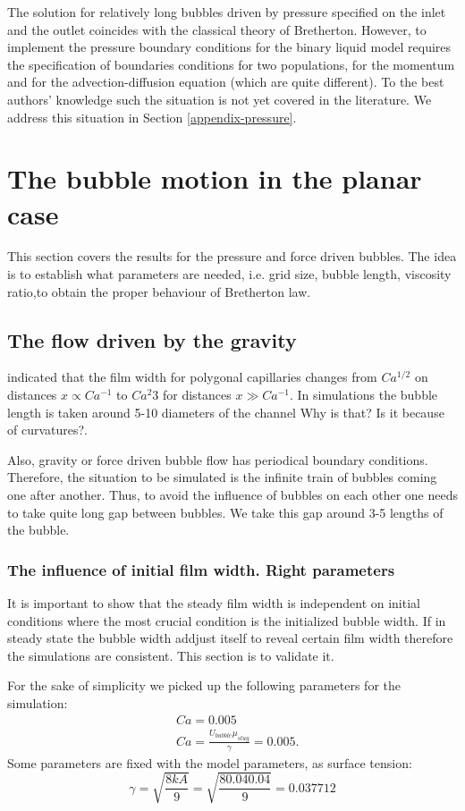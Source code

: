\documentclass{article}
\begin{document}
The solution
for relatively long bubbles driven by pressure specified on the inlet and the
outlet coincides with the classical theory of Bretherton. However, to implement
the pressure boundary conditions for the binary liquid model requires the
specification of boundaries conditions for two populations, for the momentum and
for the advection-diffusion equation (which are quite different). To the best
authors' knowledge such the situation is not yet covered in the literature. We
address this situation in Section \ref{appendix-pressure}. 

\section{The bubble motion in the planar case}
This section covers the results for the pressure and force driven bubbles. The
idea is to establish what parameters are needed, i.e. grid size, bubble length,
viscosity ratio,to obtain the proper behaviour of Bretherton law.  

\subsection{The flow driven by the gravity}
\citet{wong-films} indicated that the film width for polygonal capillaries
changes from $Ca^{1/2}$ on distances $x\propto Ca^{-1}$ to $Ca^{2}{3}$ for
distances $x \gg Ca^{-1}$. In simulations the bubble length is taken around 5-10
diameters of the channel {\color{red} Why is that? Is it because of
curvatures?}. 

Also, gravity or force driven bubble flow has periodical boundary conditions.
Therefore, the situation to be simulated is the infinite train of bubbles
coming one after another. Thus, to avoid the influence of bubbles on each other
one needs to take quite long gap between bubbles. We take this gap around 3-5
lengths of the bubble.

\subsubsection{The influence of initial film width. Right parameters}
It is important to show that the steady film width is independent on initial
conditions where the most crucial condition is the initialized bubble width. If
in steady state the bubble width addjust itself to reveal certain film width
therefore the simulations are consistent. This section is to validate it.
 
For the sake of simplicity we picked up the following parameters for the
simulation:
\begin{equation}
\begin{aligned}
&Ca=0.005\\
&Ca=\frac{U_{bubble} \mu_{slug}}{\gamma}=0.005.
\end{aligned}
\end{equation}
Some parameters are fixed with the model parameters, as surface tension:
\begin{equation}
\gamma=\sqrt{\frac{8 k A}{9}}=\sqrt{\frac{8 0.04 0.04}{9}}=0.037712
\end{equation}
\end{document}
